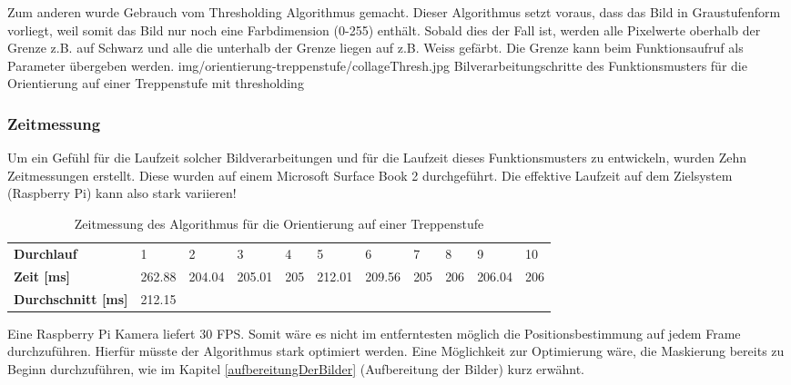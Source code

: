 Zum anderen wurde Gebrauch vom Thresholding Algorithmus\cite{OpenCV-Threshold} gemacht. Dieser Algorithmus setzt voraus, dass das Bild in Graustufenform vorliegt, weil somit das Bild nur noch eine Farbdimension (0-255) enthält. Sobald dies der Fall ist, werden alle Pixelwerte oberhalb der Grenze z.B. auf Schwarz und alle die unterhalb der Grenze liegen auf z.B. Weiss gefärbt. Die Grenze kann beim Funktionsaufruf als Parameter übergeben werden.
\image
  {img/orientierung-treppenstufe/collageThresh.jpg}
  {Bilverarbeitungschritte des Funktionsmusters für die Orientierung auf einer Treppenstufe mit thresholding}
  
\subsubsection{Zeitmessung}
Um ein Gefühl für die Laufzeit solcher Bildverarbeitungen und für die Laufzeit dieses Funktionsmusters zu entwickeln, wurden Zehn Zeitmessungen erstellt. Diese wurden auf einem Microsoft Surface Book 2 durchgeführt. Die effektive Laufzeit auf dem Zielsystem (Raspberry Pi) kann also stark variieren!

\begin{center}
\begin{table}[ht!]
    \begin{tabular}{l|l|l|l|l|l|l|l|l|l|l}
        \textbf{Durchlauf} & 1 & 2 & 3 & 4 & 5 & 6 & 7 & 8 & 9 & 10 \\
        \textbf{Zeit [ms]} & 262.88 & 204.04 & 205.01 & 205 & 212.01 & 209.56 & 205 & 206 & 206.04 & 206 \\
        \textbf{Durchschnitt [ms]} & 212.15 \\
    \end{tabular}
    \caption{Zeitmessung des Algorithmus für die Orientierung auf einer Treppenstufe}
\end{table}
\end{center}

Eine Raspberry Pi Kamera liefert 30 FPS. Somit wäre es nicht im entferntesten möglich die Positionsbestimmung auf jedem Frame durchzuführen. Hierfür müsste der Algorithmus stark optimiert werden. Eine Möglichkeit zur Optimierung wäre, die Maskierung bereits zu Beginn durchzuführen, wie im Kapitel \ref{aufbereitungDerBilder} (Aufbereitung der Bilder) kurz erwähnt.
  
